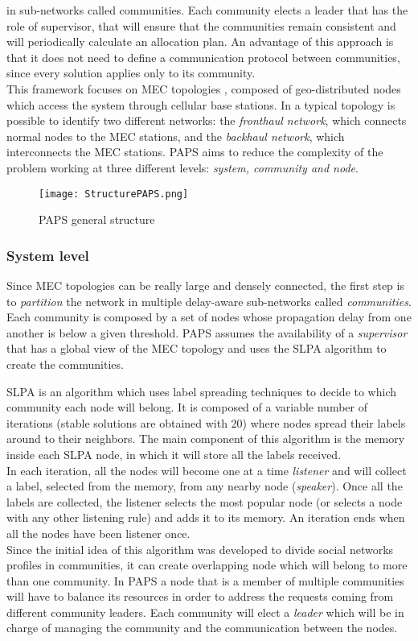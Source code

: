 in sub-networks called communities. Each community elects a leader that has the role of supervisor, that
will ensure that the communities remain consistent and will periodically calculate an allocation plan.
An advantage of this approach is that it does not need to define a communication protocol between communities,
since every solution applies only to its community.
\\
This framework focuses on MEC topologies \cite{MEC1,MEC2}, composed of geo-distributed nodes which access
the system through cellular base stations. In a typical topology is possible to identify
two different networks: the \textit{fronthaul network}, which connects normal nodes to 
the MEC stations, and the \textit{backhaul network}, which interconnects the MEC stations.
PAPS aims to reduce the complexity of the problem working at three different levels: 
\textit{system, community and node}. 
\\
\begin{figure}[h]
    \texttt{[image: StructurePAPS.png]}
    \label{fig:structure}
    \caption{PAPS general structure}
\end{figure}

\subsubsection*{System level}
Since MEC topologies can be really large and densely connected, the first step is to \textit{partition}
the network in multiple delay-aware sub-networks called \textit{communities}. Each community
is composed by a set of nodes whose propagation delay from one another is below a given 
threshold. PAPS assumes the availability of a \textit{supervisor} that has a global view of
the MEC topology and uses the SLPA \cite{SLPA} algorithm to create the communities.
\par
SLPA is an algorithm which uses label spreading techniques to decide to which community each node will belong.
It is composed of a variable number of iterations (stable solutions are obtained with 20) where nodes spread their labels 
around to their neighbors.
The main component of this  algorithm is the memory inside each SLPA node, in which it will store all the labels received.
\\
In each iteration, all the nodes will become one at a time 
\textit{listener} and will collect a label, selected from the memory, from any nearby 
node (\textit{speaker}). Once all the labels are collected, the listener selects the 
most popular node (or selects a node with any other listening rule) and adds it to its
memory.
An iteration ends when all the nodes have been listener once. \\
Since the initial idea of this 
algorithm was developed to divide social networks profiles in communities, it can create 
overlapping node which will belong to more than one community. 
In PAPS a node that is a member of multiple communities will have to balance its resources in order to address
the requests coming from different community leaders.
Each community will
elect a \textit{leader} which will be in charge of managing the community and the communication
between the nodes.

